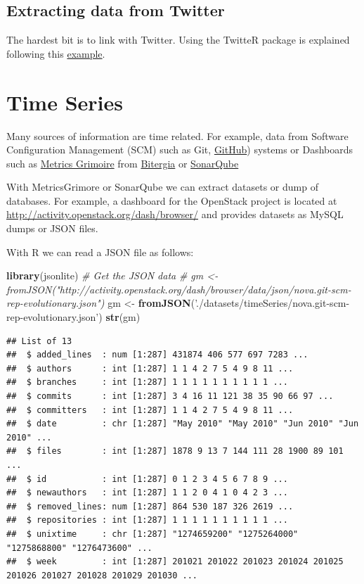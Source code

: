 \documentclass[]{book}
\newenvironment{Shaded}{\begin{snugshade}}{\end{snugshade}}
\newcommand{\KeywordTok}[1]{\textcolor[rgb]{0.13,0.29,0.53}{\textbf{{#1}}}}
\newcommand{\StringTok}[1]{\textcolor[rgb]{0.31,0.60,0.02}{{#1}}}
\newcommand{\CommentTok}[1]{\textcolor[rgb]{0.56,0.35,0.01}{\textit{{#1}}}}
\newcommand{\NormalTok}[1]{{#1}}
\begin{document}
\section{Extracting data from
Twitter}\label{extracting-data-from-twitter}

The hardest bit is to link with Twitter. Using the TwitteR package is
explained following this \href{./twitter.Rmd}{example}.

\chapter{Time Series}\label{time-series}

Many sources of information are time related. For example, data from
Software Configuration Management (SCM) such as Git,
\href{http://www.github.com}{GitHub}) systems or Dashboards such as
\href{http://metricsgrimoire.github.io/}{Metrics Grimoire} from
\href{http://bitergia.com/}{Bitergia} or
\href{http://www.sonarqube.org/}{SonarQube}

With MetricsGrimore or SonarQube we can extract datasets or dump of
databases. For example, a dashboard for the OpenStack project is located
at \url{http://activity.openstack.org/dash/browser/} and provides
datasets as MySQL dumps or JSON files.

With R we can read a JSON file as follows:

\begin{Shaded}
\begin{Highlighting}[]
\KeywordTok{library}\NormalTok{(jsonlite)}
\CommentTok{# Get the JSON data }
\CommentTok{# gm <- fromJSON("http://activity.openstack.org/dash/browser/data/json/nova.git-scm-rep-evolutionary.json")}
\NormalTok{gm <-}\StringTok{ }\KeywordTok{fromJSON}\NormalTok{(}\StringTok{'./datasets/timeSeries/nova.git-scm-rep-evolutionary.json'}\NormalTok{)}
\KeywordTok{str}\NormalTok{(gm)}
\end{Highlighting}
\end{Shaded}

\begin{verbatim}
## List of 13
##  $ added_lines  : num [1:287] 431874 406 577 697 7283 ...
##  $ authors      : int [1:287] 1 1 4 2 7 5 4 9 8 11 ...
##  $ branches     : int [1:287] 1 1 1 1 1 1 1 1 1 1 ...
##  $ commits      : int [1:287] 3 4 16 11 121 38 35 90 66 97 ...
##  $ committers   : int [1:287] 1 1 4 2 7 5 4 9 8 11 ...
##  $ date         : chr [1:287] "May 2010" "May 2010" "Jun 2010" "Jun 2010" ...
##  $ files        : int [1:287] 1878 9 13 7 144 111 28 1900 89 101 ...
##  $ id           : int [1:287] 0 1 2 3 4 5 6 7 8 9 ...
##  $ newauthors   : int [1:287] 1 1 2 0 4 1 0 4 2 3 ...
##  $ removed_lines: num [1:287] 864 530 187 326 2619 ...
##  $ repositories : int [1:287] 1 1 1 1 1 1 1 1 1 1 ...
##  $ unixtime     : chr [1:287] "1274659200" "1275264000" "1275868800" "1276473600" ...
##  $ week         : int [1:287] 201021 201022 201023 201024 201025 201026 201027 201028 201029 201030 ...
\end{verbatim}
\end{document}
